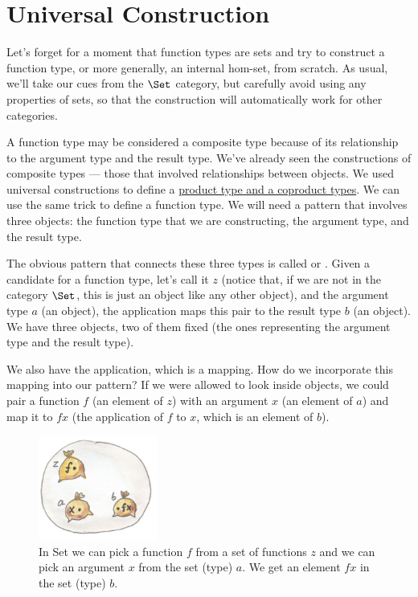 \section{Universal Construction}

Let's forget for a moment that function types are sets and try to
construct a function type, or more generally, an internal hom-set, from
scratch. As usual, we'll take our cues from the $\Set$ category,
but carefully avoid using any properties of sets, so that the
construction will automatically work for other categories.

A function type may be considered a composite type because of its
relationship to the argument type and the result type. We've already
seen the constructions of composite types --- those that involved
relationships between objects. We used universal constructions to define
a \hyperref[products-and-coproducts]{product
type and a coproduct types}. We can use the same trick to define a
function type. We will need a pattern that involves three objects: the
function type that we are constructing, the argument type, and the
result type.

The obvious pattern that connects these three types is called
 or . Given a candidate for
a function type, let's call it $z$ (notice that, if we are not in
the category $\Set$, this is just an object like any other
object), and the argument type $a$ (an object), the application
maps this pair to the result type $b$ (an object). We have three
objects, two of them fixed (the ones representing the argument type and
the result type).

We also have the application, which is a mapping. How do we incorporate
this mapping into our pattern? If we were allowed to look inside
objects, we could pair a function $f$ (an element of $z$)
with an argument $x$ (an element of $a$) and map it to
$f x$ (the application of $f$ to $x$, which is an
element of $b$).

\begin{figure}[H]
\centering\includegraphics[width=0.35\textwidth]{images/functionset.jpg}
\caption{In Set we can pick a function $f$ from a set of functions $z$ and we can
pick an argument $x$ from the set (type) $a$. We get an element $f x$ in the
set (type) $b$.}
\end{figure}


